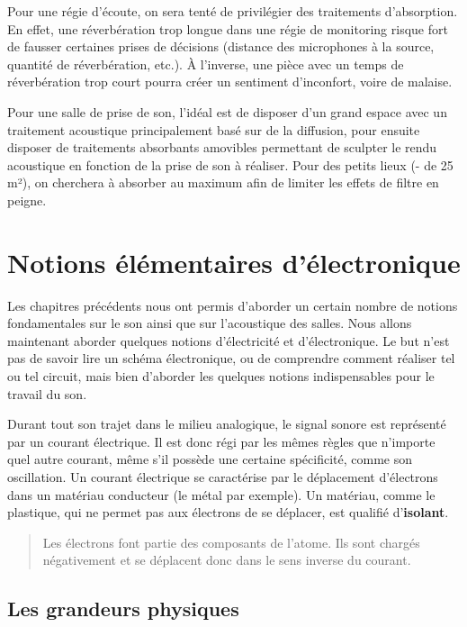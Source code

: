 \documentclass[
  letterpaper,
  DIV=11,
  numbers=noendperiod]{scrreprt}
\begin{document}
Pour une régie d'écoute, on sera tenté de privilégier des traitements
d'absorption. En effet, une réverbération trop longue dans une régie de
monitoring risque fort de fausser certaines prises de décisions
(distance des microphones à la source, quantité de réverbération, etc.).
À l'inverse, une pièce avec un temps de réverbération trop court pourra
créer un sentiment d'inconfort, voire de malaise.

Pour une salle de prise de son, l'idéal est de disposer d'un grand
espace avec un traitement acoustique principalement basé sur de la
diffusion, pour ensuite disposer de traitements absorbants amovibles
permettant de sculpter le rendu acoustique en fonction de la prise de
son à réaliser. Pour des petits lieux (- de 25 m²), on cherchera à
absorber au maximum afin de limiter les effets de filtre en peigne.

\hypertarget{notions-uxe9luxe9mentaires-duxe9lectronique}{%
\chapter{Notions élémentaires
d'électronique}\label{notions-uxe9luxe9mentaires-duxe9lectronique}}

Les chapitres précédents nous ont permis d'aborder un certain nombre de
notions fondamentales sur le son ainsi que sur l'acoustique des salles.
Nous allons maintenant aborder quelques notions d'électricité et
d'électronique. Le but n'est pas de savoir lire un schéma électronique,
ou de comprendre comment réaliser tel ou tel circuit, mais bien
d'aborder les quelques notions indispensables pour le travail du son.

Durant tout son trajet dans le milieu analogique, le signal sonore est
représenté par un courant électrique. Il est donc régi par les mêmes
règles que n'importe quel autre courant, même s'il possède une certaine
spécificité, comme son oscillation. Un courant électrique se caractérise
par le déplacement d'électrons dans un matériau conducteur (le métal par
exemple). Un matériau, comme le plastique, qui ne permet pas aux
électrons de se déplacer, est qualifié d'\textbf{isolant}.

\begin{quote}
Les électrons font partie des composants de l'atome. Ils sont chargés
négativement et se déplacent donc dans le sens inverse du courant.
\end{quote}

\hypertarget{les-grandeurs-physiques}{%
\section{Les grandeurs physiques}\label{les-grandeurs-physiques}}
\end{document}
